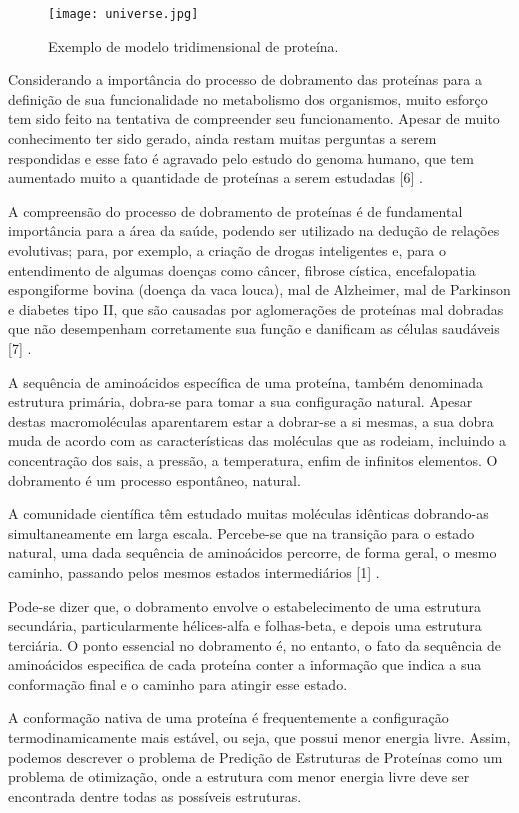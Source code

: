 \documentclass[dm,ppgcomp]{texfurg}
\begin{document}
\begin{figure}[htbp]
  \centering \texttt{[image: universe.jpg]}
\caption{Exemplo de modelo tridimensional de proteína.} 
\label{figura1}
\end{figure}

Considerando a importância do processo de dobramento das proteínas para a definição de sua funcionalidade no metabolismo dos organismos, muito esforço tem sido feito na tentativa de compreender seu funcionamento. Apesar de muito conhecimento ter sido gerado, ainda restam muitas perguntas a serem respondidas e esse fato é agravado pelo estudo do genoma humano, que tem aumentado muito a quantidade de proteínas a serem estudadas [6] . 

A compreensão do processo de dobramento de proteínas é de fundamental importância para a área da saúde, podendo ser utilizado na dedução de relações evolutivas; para, por exemplo, a criação de drogas inteligentes e, para o entendimento de algumas doenças como câncer, fibrose cística, encefalopatia espongiforme bovina (doença da vaca louca), mal de Alzheimer, mal de Parkinson e diabetes tipo II, que são causadas por aglomerações de proteínas mal dobradas que não desempenham corretamente sua função e danificam as células saudáveis [7] .

A sequência de aminoácidos específica de uma proteína, também denominada estrutura primária, dobra-se para tomar a sua configuração natural. Apesar destas macromoléculas aparentarem estar a dobrar-se a si mesmas, a sua dobra muda de acordo com as características das moléculas que as rodeiam, incluindo a concentração dos sais, a pressão, a temperatura, enfim de infinitos elementos. O dobramento é um processo espontâneo, natural.

A comunidade científica têm estudado muitas moléculas idênticas dobrando-as simultaneamente em larga escala. Percebe-se que na transição para o estado natural, uma dada sequência de aminoácidos percorre, de forma geral, o mesmo caminho, passando pelos mesmos estados intermediários [1] .

Pode-se dizer que, o dobramento envolve o estabelecimento de uma estrutura secundária, particularmente hélices-alfa e folhas-beta, e depois uma estrutura terciária. O ponto essencial no dobramento é, no entanto, o fato da sequência de aminoácidos especifica de cada proteína conter a informação que indica a sua conformação final e o caminho para atingir esse estado.

A conformação nativa de uma proteína é frequentemente a configuração termodinamicamente mais estável, ou seja, que possui menor energia livre. Assim, podemos descrever o problema de Predição de Estruturas de Proteínas como um problema de otimização, onde a estrutura com menor energia livre deve ser encontrada dentre todas as possíveis estruturas. 
\end{document}
